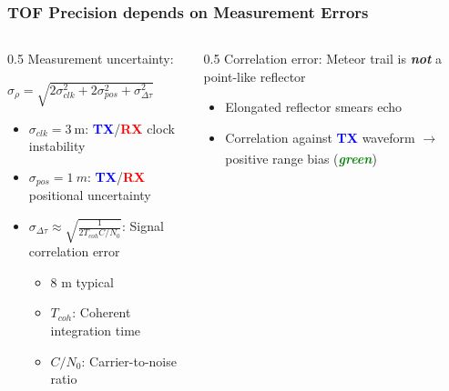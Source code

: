\begin{frame}[label=gnss_viability]
    \frametitle{TOF Precision depends on \alert{Measurement Errors}}
    \begin{columns}[T]
        \begin{column}{0.5\textwidth}
            Measurement uncertainty: %
            \begin{center}
                \(\sigma_\rho = \sqrt{2\sigma^2_{clk} + 2\sigma^2_{pos} + \sigma^2_{\Delta\tau}}\)
            \end{center} %
            {\setlength{\leftmargini}{1em} \begin{itemize}
                \item \(\sigma_{clk} = \qty{3}{\m}\): \textcolor{blue}{\textbf{TX}}/\textcolor{red}{\textbf{RX}} clock instability
                \item \(\sigma_{pos} = \qty{1}{m}\): \textcolor{blue}{\textbf{TX}}/\textcolor{red}{\textbf{RX}} positional uncertainty
                \item \(\sigma_{\Delta\tau} \approx \sqrt{\frac{1}{2 T_{coh} C/N_0}} \): Signal correlation error
                \begin{itemize}
                    \item 8 m typical 
                    \item \(T_{coh}\): Coherent integration time
                    \item \(C/N_0\): Carrier-to-noise ratio
                \end{itemize}
            \end{itemize}}
        \end{column}
        \vrule{}
        \begin{column}{0.5\textwidth}
            \alert{Correlation error}: Meteor trail is \textit{\textbf{not}} a point-like reflector
            \begin{itemize}
                \item Elongated reflector smears echo
                \item Correlation against \textcolor{blue}{\textbf{TX}} waveform \(\xrightarrow[]{}\) positive range bias (\textcolor{green}{\textit{\textbf{green}}})
            \end{itemize}
            \centering
\end{column}
\end{columns}
\end{frame}
